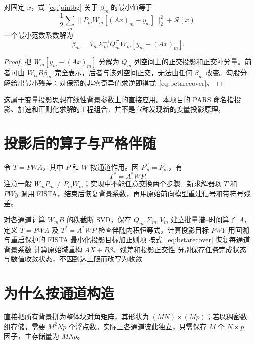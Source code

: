 \begin{proposition}
对固定 $x$，式~\eqref{eq:jointbg} 关于 $\beta_m$ 的最小值等于
\begin{equation}
\frac12\sum_m\|P_mW_m[(Ax)_m-y_m]\|_2^2+\mathcal R(x).
\end{equation}
一个最小范数系数解为
\begin{equation}
\beta_m=V_m\Sigma_m^{-1}Q_m^TW_m[y_m-(Ax)_m].\label{eq:betarecover}
\end{equation}
\end{proposition}
\begin{proof}
把 $W_m[y_m-(Ax)_m]$ 分解为 $Q_m$ 列空间上的正交投影和正交补分量。前者可由 $W_mB\beta_m$ 完全表示，后者与该列空间正交，无法由任何 $\beta_m$ 改变。勾股分解给出最小残差；对保留的非零奇异值求逆即得式~\eqref{eq:betarecover}。
\end{proof}
这属于变量投影思想在线性背景参数上的直接应用\cite{varpro}。本项目的 PARS 命名指投影、加速和正则化求解的工程组合，并不是宣称发现新的变量投影原理。

\section{投影后的算子与严格伴随}
令 $T=PW A$，其中 $P$ 和 $W$ 按通道作用。因 $P_m^T=P_m$，有
\begin{equation}
T^*=A^*WP.
\end{equation}
注意一般 $W_mP_m\ne P_mW_m$；实现中不能任意交换两个步骤。新求解器以 $T$ 和 $PWy$ 调用 FISTA，结束后恢复背景系数，再用原始前向模型重建信号和带符号残差。

\begin{algorithm}[htbp]
\caption{分通道背景消元的谱--时间求解}
对各通道计算 $W_mB$ 的秩截断 SVD，保存 $Q_m,\Sigma_m,V_m$\;
建立批量谱--时间算子 $A$，定义 $T=PW A$ 及 $T^*=A^*WP$\;
检查伴随内积恒等式，计算投影目标 $PWY$\;
用回溯与重启保护的 FISTA 最小化投影目标加正则项\;
按式~\eqref{eq:betarecover} 恢复每通道背景系数\;
计算原始域重构 $AX+B\beta$、残差和投影正交性\;
分别保存任务完成状态与数值收敛状态，不因到达上限而改写为收敛\;
\end{algorithm}

\section{为什么按通道构造}
直接把所有背景拼为整体块对角矩阵，其形状为 $(MN)\times(Mp)$；若以稠密数组存储，需要 $M^2Np$ 个浮点数。实际上各通道彼此独立，只需保存 $M$ 个 $N\times p$ 因子，主存储量为 $MNp$。

